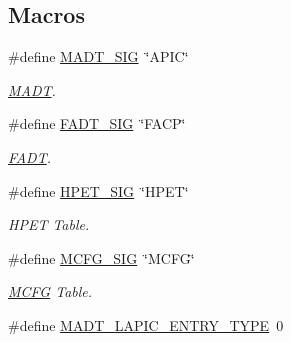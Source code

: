\subsection*{Macros}
\begin{DoxyCompactItemize}
\item 
\#define \hyperlink{group__acpi__tables_ga6e966555ad9c8eaf6dcb718de074d870}{M\+A\+D\+T\+\_\+\+S\+IG}~\char`\"{}A\+P\+IC\char`\"{}\hypertarget{group__acpi__tables_ga6e966555ad9c8eaf6dcb718de074d870}{}\label{group__acpi__tables_ga6e966555ad9c8eaf6dcb718de074d870}

\begin{DoxyCompactList}\small\item\em \hyperlink{structMADT}{M\+A\+DT}. \end{DoxyCompactList}\item 
\#define \hyperlink{group__acpi__tables_ga45c39b8a5e8a350bda6da743f0e2e983}{F\+A\+D\+T\+\_\+\+S\+IG}~\char`\"{}F\+A\+CP\char`\"{}\hypertarget{group__acpi__tables_ga45c39b8a5e8a350bda6da743f0e2e983}{}\label{group__acpi__tables_ga45c39b8a5e8a350bda6da743f0e2e983}

\begin{DoxyCompactList}\small\item\em \hyperlink{structFADT}{F\+A\+DT}. \end{DoxyCompactList}\item 
\#define \hyperlink{group__acpi__tables_ga1821c66b58038ee3216b0edda540d5c6}{H\+P\+E\+T\+\_\+\+S\+IG}~\char`\"{}H\+P\+ET\char`\"{}\hypertarget{group__acpi__tables_ga1821c66b58038ee3216b0edda540d5c6}{}\label{group__acpi__tables_ga1821c66b58038ee3216b0edda540d5c6}

\begin{DoxyCompactList}\small\item\em H\+P\+ET Table. \end{DoxyCompactList}\item 
\#define \hyperlink{group__acpi__tables_ga0928a2f6fe80de39820060619520dbd4}{M\+C\+F\+G\+\_\+\+S\+IG}~\char`\"{}M\+C\+FG\char`\"{}\hypertarget{group__acpi__tables_ga0928a2f6fe80de39820060619520dbd4}{}\label{group__acpi__tables_ga0928a2f6fe80de39820060619520dbd4}

\begin{DoxyCompactList}\small\item\em \hyperlink{structMCFG}{M\+C\+FG} Table. \end{DoxyCompactList}\item 
\#define \hyperlink{group__acpi__tables_gabe8f506dc70b295e11543b79a2951ef3}{M\+A\+D\+T\+\_\+\+L\+A\+P\+I\+C\+\_\+\+E\+N\+T\+R\+Y\+\_\+\+T\+Y\+PE}~0\hypertarget{group__acpi__tables_gabe8f506dc70b295e11543b79a2951ef3}{}\label{group__acpi__tables_gabe8f506dc70b295e11543b79a2951ef3}


\end{DoxyCompactItemize}
